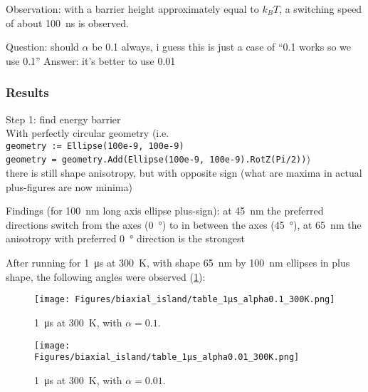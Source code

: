 \documentclass[10pt,a4paper]{article}
\newcommand{\code}[1]{\texttt{#1}}
\begin{document}
	Observation: with a barrier height approximately equal to $k_B T$, a switching speed of about \SI{100}{\nano\second} is observed.
	
	Question: should $\alpha$ be 0.1 always, i guess this is just a case of ``0.1 works so we use 0.1''
	Answer: it's better to use 0.01
	
	\subsubsection{Results}
	Step 1: find energy barrier \\
	With perfectly circular geometry (i.e. \\
	\code{geometry := Ellipse(100e-9, 100e-9)} \\
	\code{geometry = geometry.Add(Ellipse(100e-9, 100e-9).RotZ(Pi/2))}) \\
	there is still shape anisotropy, but with opposite sign (what are maxima in actual plus-figures are now minima)
	
	Findings (for \SI{100}{\nano\metre} long axis ellipse plus-sign):
	at \SI{45}{\nano\metre} the preferred directions switch from the axes (\SI{0}{\degree}) to in between the axes (\SI{45}{\degree}),
	at \SI{65}{\nano\metre} the anisotropy with preferred \SI{0}{\degree} direction is the strongest
	
	After running for \SI{1}{\micro\second} at \SI{300}{\kelvin}, with shape \SI{65}{\nano\metre} by \SI{100}{\nano\metre} ellipses in plus shape, the following angles were observed (\cref{fig:biaxial_island:1microsecond_300K_alpha0.1}):
	\begin{figure}
	    \centering
	    \texttt{[image: Figures/biaxial\_island/table\_1µs\_alpha0.1\_300K.png]}
	    \caption{\SI{1}{\micro\second} at \SI{300}{\kelvin}, with $\alpha=0.1$.}
	    \label{fig:biaxial_island:1microsecond_300K_alpha0.1}
	\end{figure}
	\begin{figure}
	    \centering
	    \texttt{[image: Figures/biaxial\_island/table\_1µs\_alpha0.01\_300K.png]}
	    \caption{\SI{1}{\micro\second} at \SI{300}{\kelvin}, with $\alpha=0.01$.}
	    \label{fig:biaxial_island:1microsecond_300K_alpha0.01}
	\end{figure}
	
	
	\newpage
	
	
\end{document}
